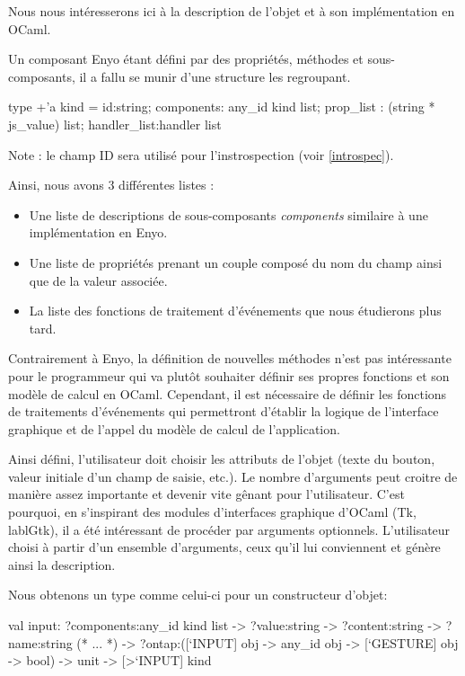 \documentclass[11pt,a4paper]{report}
\begin{document}
Nous nous intéresserons ici à la description de l'objet et à son implémentation en OCaml.

Un composant Enyo étant défini par des propriétés, méthodes et sous-composants, il a fallu se munir
d'une structure les regroupant.
\begin{OCaml}
  type +'a kind = {id:string; 
                   components: any_id kind list; 
                   prop_list : (string * js_value) list;
                   handler_list:handler list
                  }
\end{OCaml}

Note : le champ ID sera utilisé pour l'instrospection (voir \ref{introspec}).

Ainsi, nous avons 3 différentes listes :
\begin{itemize}
\item Une liste de descriptions de sous-composants \emph{components} similaire à
  une implémentation en Enyo.
\item Une liste de propriétés prenant un couple composé du nom du champ ainsi 
  que de la valeur associée.
\item La liste des fonctions de traitement d'événements que nous étudierons plus tard.
\end{itemize}

Contrairement à Enyo, la définition de nouvelles méthodes n'est pas intéressante pour le programmeur
qui va plutôt souhaiter définir ses propres fonctions et son modèle de calcul en OCaml.
Cependant, il est nécessaire de définir les fonctions de traitements d'événements qui permettront
d'établir la logique de l'interface graphique et de l'appel du modèle de calcul de l'application.

Ainsi défini, l'utilisateur doit choisir les attributs de l'objet (texte du bouton, valeur initiale
d'un champ de saisie, etc.). Le nombre d'arguments peut croitre de manière assez importante et devenir
vite gênant pour l'utilisateur.
C'est pourquoi, en s'inspirant des modules d'interfaces graphique d'OCaml (Tk, lablGtk), il a été intéressant de
procéder par arguments optionnels. L'utilisateur choisi à partir d'un ensemble d'arguments, ceux qu'il 
lui conviennent et génère ainsi la description.

Nous obtenons un type comme celui-ci pour un constructeur d'objet:
\begin{OCaml}
  val input:
            ?components:any_id kind list
            -> ?value:string
            -> ?content:string
            -> ?name:string
            (* ... *)
     	    -> ?ontap:([`INPUT] obj -> any_id obj -> [`GESTURE] obj -> bool)
  	    -> unit -> [>`INPUT] kind
\end{OCaml}
\end{document}
